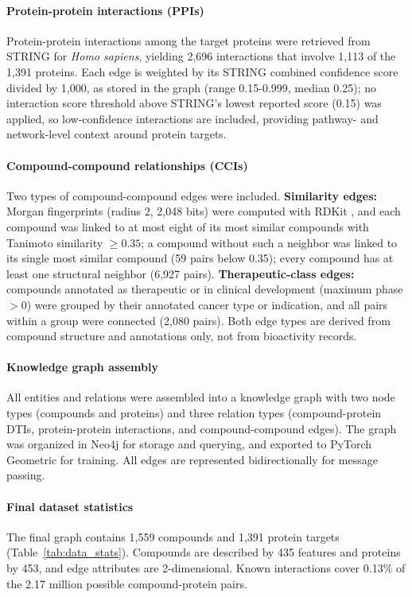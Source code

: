 \documentclass[11pt,letterpaper]{article}
\begin{document}
\paragraph{Protein-protein interactions (PPIs)}
Protein-protein interactions among the target proteins were retrieved from STRING \cite{szklarczyk2023string} for \textit{Homo sapiens}, yielding 2,696 interactions that involve 1,113 of the 1,391 proteins. Each edge is weighted by its STRING combined confidence score divided by 1,000, as stored in the graph (range 0.15-0.999, median 0.25); no interaction score threshold above STRING's lowest reported score (0.15) was applied, so low-confidence interactions are included, providing pathway- and network-level context around protein targets.

\paragraph{Compound-compound relationships (CCIs)}
Two types of compound-compound edges were included. \textbf{Similarity edges:} Morgan fingerprints (radius 2, 2,048 bits) \cite{rogers2010extended} were computed with RDKit \cite{landrum_rdkit}, and each compound was linked to at most eight of its most similar compounds with Tanimoto similarity $\geq 0.35$; a compound without such a neighbor was linked to its single most similar compound (59 pairs below 0.35); every compound has at least one structural neighbor (6,927 pairs). \textbf{Therapeutic-class edges:} compounds annotated as therapeutic or in clinical development (maximum phase $>0$) were grouped by their annotated cancer type or indication, and all pairs within a group were connected (2,080 pairs). Both edge types are derived from compound structure and annotations only, not from bioactivity records.

\paragraph{Knowledge graph assembly}
All entities and relations were assembled into a knowledge graph with two node types (compounds and proteins) and three relation types (compound-protein DTIs, protein-protein interactions, and compound-compound edges). The graph was organized in Neo4j \cite{neo4j} for storage and querying, and exported to PyTorch Geometric for training. All edges are represented bidirectionally for message passing.

\paragraph{Final dataset statistics}
The final graph contains 1,559 compounds and 1,391 protein targets (Table~\ref{tab:data_stats}). Compounds are described by 435 features and proteins by 453, and edge attributes are 2-dimensional. Known interactions cover 0.13\% of the 2.17 million possible compound-protein pairs.
\end{document}
